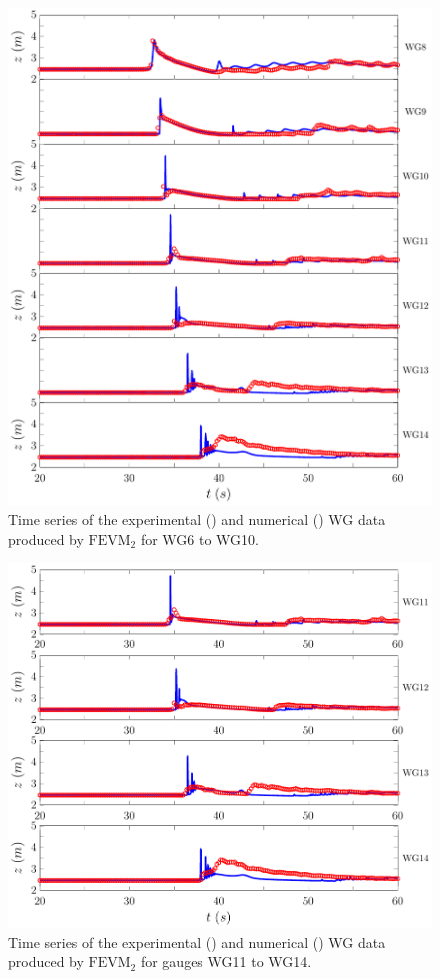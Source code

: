 \begin{figure}
	\centering
	\includegraphics[width=\textwidth]{./chp6/figures/Experiment/Roeber/Trial8/FEVM/LongWGs2.pdf}
	\caption{Time series of the experimental () and numerical ({\color{blue}\solidrule}) WG data produced by $\text{FEVM}_2$ for WG6 to WG10.}
	\label{fig:Roeber8WG6to10FEVM}
\end{figure}  
\begin{figure}
	\centering
	\includegraphics[width=\textwidth]{./chp6/figures/Experiment/Roeber/Trial8/FEVM/LongWGs3.pdf}
	\caption{Time series of the experimental () and numerical ({\color{blue}\solidrule}) WG data produced by $\text{FEVM}_2$ for gauges WG11 to WG14.}
	\label{fig:Roeber8WG11to14FEVM}
\end{figure}         
